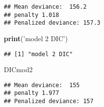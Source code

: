 \documentclass[]{article}
\newenvironment{Shaded}{\begin{snugshade}}{\end{snugshade}}
\newcommand{\KeywordTok}[1]{\textcolor[rgb]{0.13,0.29,0.53}{\textbf{#1}}}
\newcommand{\StringTok}[1]{\textcolor[rgb]{0.31,0.60,0.02}{#1}}
\newcommand{\NormalTok}[1]{#1}
\begin{document}
\begin{verbatim}
## Mean deviance:  156.2 
## penalty 1.018 
## Penalized deviance: 157.3
\end{verbatim}

\begin{Shaded}
\begin{Highlighting}[]
\KeywordTok{print}\NormalTok{(}\StringTok{'model 2 DIC'}\NormalTok{)}
\end{Highlighting}
\end{Shaded}

\begin{verbatim}
## [1] "model 2 DIC"
\end{verbatim}

\begin{Shaded}
\begin{Highlighting}[]
\NormalTok{DICmod2}
\end{Highlighting}
\end{Shaded}

\begin{verbatim}
## Mean deviance:  155 
## penalty 1.977 
## Penalized deviance: 157
\end{verbatim}
\end{document}
